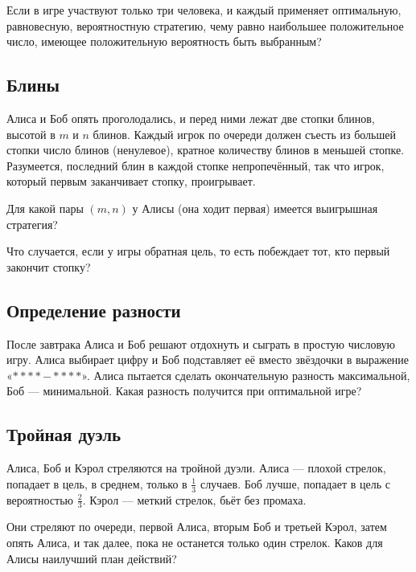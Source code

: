 Если в игре участвуют только три человека, и каждый применяет оптимальную, равновесную, вероятностную стратегию, чему равно наибольшее положительное число, имеющее положительную вероятность быть выбранным?

\subsection*{Блины}%

Алиса и Боб опять проголодались, и перед ними лежат две стопки блинов, высотой в $m$ и $n$ блинов.
Каждый игрок по очереди должен съесть из большей стопки число блинов (ненулевое), кратное количеству блинов в меньшей стопке.
Разумеется, последний блин в каждой стопке непропечённый, так что игрок, который первым заканчивает стопку, проигрывает.

Для какой пары $(m,n)$ у Алисы (она ходит первая) имеется выигрышная стратегия?

Что случается, если у игры обратная цель, то есть побеждает тот, кто первый закончит стопку?

\subsection*{Определение разности}%

После завтрака Алиса и Боб решают отдохнуть и сыграть в простую числовую игру.
Алиса выбирает цифру и Боб подставляет её вместо звёздочки в выражение «$**** - ****$». 
Алиса пытается сделать окончательную разность максимальной, Боб --- минимальной.
Какая разность получится при оптимальной игре?

\subsection*{Тройная дуэль}%

Алиса, Боб и Кэрол стреляются на тройной дуэли.
Алиса --- плохой стрелок, попадает в цель, в среднем, только в $\tfrac13$ случаев.
Боб лучше, попадает в цель с вероятностью $\tfrac23$.
Кэрол --- меткий стрелок, бьёт без промаха.

Они стреляют по очереди, первой Алиса, вторым Боб и третьей Кэрол, затем опять Алиса, и так далее, пока не останется только один стрелок.
Каков для Алисы наилучший план действий?
